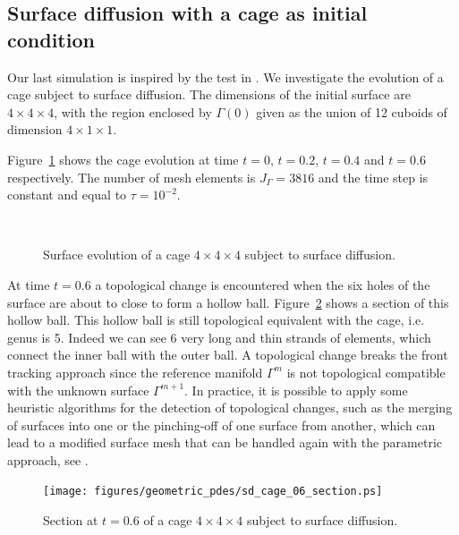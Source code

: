 \subsection{Surface diffusion with a cage as initial condition}
\label{subsec:sd_cage}
Our last simulation is inspired by the test in \cite[Fig.~15]{gflows3d}. We
investigate the evolution of a cage subject to surface diffusion. The
dimensions of the initial surface are $4 \times 4 \times 4$, with the region
enclosed by $\Gamma(0)$ given as the union of 12 cuboids of dimension $4 \times
1 \times 1$.

Figure~\ref{fig:sd_cage} shows the cage evolution at time $t=0$, $t=0.2$,
$t=0.4$ and $t=0.6$ respectively. The number of mesh elements is
$J_\Gamma=3816$ and the time step is constant and equal to $\tau=10^{-2}$.

\begin{figure}[htbp]
\centering
{}
\\
\caption[Surface diffusion cage]{Surface evolution of a cage $4 \times 4 \times
4$ subject to surface diffusion.}
\label{fig:sd_cage}
\end{figure}

At time $t=0.6$ a topological change is encountered when the six holes of the
surface are about to close to form a hollow ball.
Figure~\ref{fig:sd_cage_section} shows a section of this hollow ball. This
hollow ball is still topological equivalent with the cage, i.e. genus is 5.
Indeed we can see 6 very long and thin strands of elements, which connect the
inner ball with the outer ball.  A topological change breaks the front tracking
approach since the reference manifold $\Gamma^m$ is not topological compatible
with the unknown surface $\Gamma^{m+1}$. In practice, it is possible to apply
some heuristic algorithms for the detection of topological changes, such as the
merging of surfaces into one or the pinching-off of one surface from another,
which can lead to a modified surface mesh that can be handled again with the
parametric approach, see \cite{Sacconi}.

\begin{figure}[htbp]
\centering
\texttt{[image: figures/geometric\_pdes/sd\_cage\_06\_section.ps]}
\caption[Surface diffusion cage section]{Section at $t=0.6$ of a cage $4 \times
4 \times 4$ subject to surface diffusion.}
\label{fig:sd_cage_section}
\end{figure}

